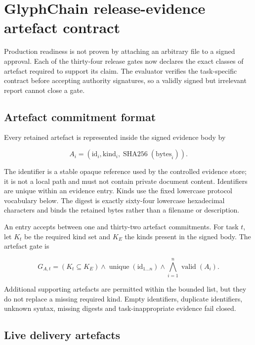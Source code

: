 \section{GlyphChain release-evidence artefact contract}
\label{sec:glyphchain-release-evidence-artifact-contract}

Production readiness is not proven by attaching an arbitrary file to a signed
approval.  Each of the thirty-four release gates now declares the exact classes of
artefact required to support its claim.  The evaluator verifies the task-specific
contract before accepting authority signatures, so a validly signed but irrelevant
report cannot close a gate.

\subsection{Artefact commitment format}

Every retained artefact is represented inside the signed evidence body by

\begin{equation}
  A_i = (\mathrm{id}_i,\mathrm{kind}_i,
         \operatorname{SHA256}(\mathrm{bytes}_i)).
\end{equation}

The identifier is a stable opaque reference used by the controlled evidence store;
it is not a local path and must not contain private document content.  Identifiers
are unique within an evidence entry.  Kinds use the fixed lowercase protocol
vocabulary below.  The digest is exactly sixty-four lowercase hexadecimal
characters and binds the retained bytes rather than a filename or description.

An entry accepts between one and thirty-two artefact commitments.  For task $t$,
let $K_t$ be the required kind set and $K_E$ the kinds present in the signed body.
The artefact gate is

\begin{equation}
  G_{A,t} = (K_t \subseteq K_E)
  \land \operatorname{unique}(\mathrm{id}_{1\ldots n})
  \land \bigwedge_{i=1}^{n}\operatorname{valid}(A_i).
\end{equation}

Additional supporting artefacts are permitted within the bounded list, but they do
not replace a missing required kind.  Empty identifiers, duplicate identifiers,
unknown syntax, missing digests and task-inappropriate evidence fail closed.

\subsection{Live delivery artefacts}

